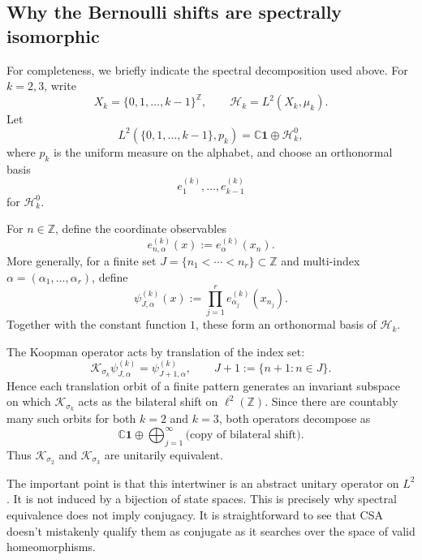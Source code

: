 \documentclass{article}
\theoremstyle{definition}
\begin{document}
\subsection{Why the Bernoulli shifts are spectrally isomorphic}
\label{app:bernoulli_spectral}

For completeness, we briefly indicate the spectral decomposition used above. For \(k=2,3\), write
\[
X_k=\{0,1,\dots,k-1\}^{\mathbb Z},
\qquad
\mathcal H_k=L^2(X_k,\mu_k).
\]
Let
\[
L^2(\{0,1,\dots,k-1\},p_k)
=
\mathbb C\mathbf 1 \oplus \mathcal H_k^0,
\]
where \(p_k\) is the uniform measure on the alphabet, and choose an orthonormal basis
\[
e_1^{(k)},\dots,e_{k-1}^{(k)}
\]
for \(\mathcal H_k^0\).

For \(n\in\mathbb Z\), define the coordinate observables
\[
e_{n,\alpha}^{(k)}(x):=e_\alpha^{(k)}(x_n).
\]
More generally, for a finite set \(J=\{n_1<\cdots<n_r\}\subset\mathbb Z\) and multi-index \(\alpha=(\alpha_1,\dots,\alpha_r)\), define
\[
\psi_{J,\alpha}^{(k)}(x)
:=
\prod_{j=1}^r e_{\alpha_j}^{(k)}(x_{n_j}).
\]
Together with the constant function \(1\), these form an orthonormal basis of \(\mathcal H_k\).

The Koopman operator acts by translation of the index set:
\[
\mathcal K_{\sigma_k}\psi_{J,\alpha}^{(k)}
=
\psi_{J+1,\alpha}^{(k)},
\qquad
J+1:=\{n+1:n\in J\}.
\]
Hence each translation orbit of a finite pattern generates an invariant subspace on which \(\mathcal K_{\sigma_k}\) acts as the bilateral shift on \(\ell^2(\mathbb Z)\). Since there are countably many such orbits for both \(k=2\) and \(k=3\), both operators decompose as
\[
\mathbb C\mathbf 1
\oplus
\bigoplus_{j=1}^\infty \text{(copy of bilateral shift)}.
\]
Thus \(\mathcal K_{\sigma_2}\) and \(\mathcal K_{\sigma_3}\) are unitarily equivalent.

The important point is that this intertwiner is an abstract unitary operator on \(L^2\). It is not induced by a bijection of state spaces. This is precisely why spectral equivalence does not imply conjugacy. It is straightforward to see that CSA doesn't mistakenly qualify them as conjugate as it searches over the space of valid homeomorphisms.
\end{document}

